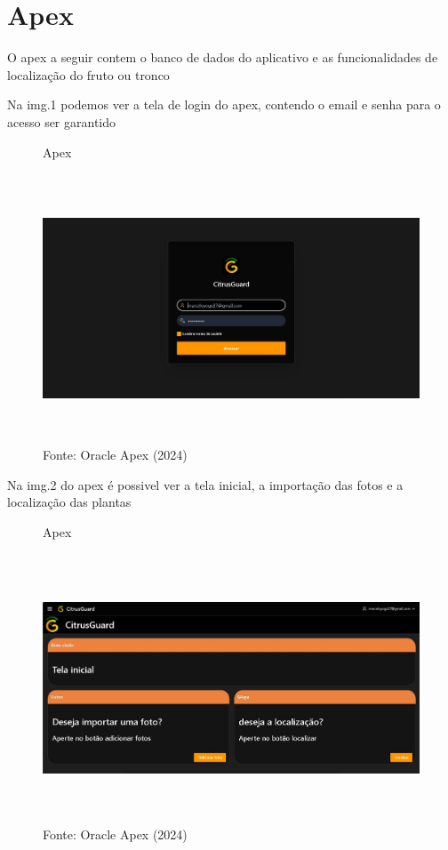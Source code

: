 \documentclass[
  a4paper,%
  12pt,%
  english,%
  brazilian,%
]{article}
\begin{document}
\section*{Apex}

O apex a seguir contem o banco de dados do aplicativo e as funcionalidades de localização do fruto ou tronco

Na img.1 podemos ver a tela de login do apex, contendo o email e senha para o acesso ser garantido 

\begin{figure}[H]
    \centering
    \caption*{Apex}
    \includegraphics[width=14cm,height=8cm]{Illustrations/APEX1.jpg}
    \caption*{Fonte: Oracle Apex (2024)}
    \label{fig:apex1}
\end{figure}

Na img.2 do apex é possivel ver a tela inicial, a importação das fotos e a localização das plantas

\begin{figure}[H]
    \centering
    \caption*{Apex}
    \includegraphics[width=14cm,height=8cm]{Illustrations/APEX2.jpg}
    \caption*{Fonte: Oracle Apex (2024)}
    \label{fig:apex2}
\end{figure}
\end{document}
